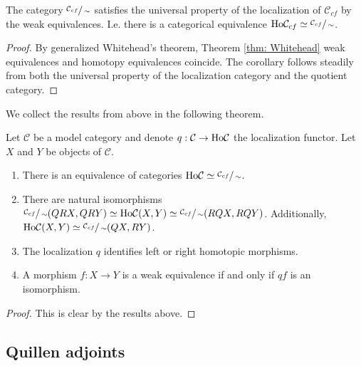 \documentclass[../thesis.tex]{subfiles}
\begin{document}
            \begin{corollary}
                The category $\sfrac{\mathcal{C}_{cf}}{\sim}$ satisfies the universal property of the localization of $\mathcal{C}_{cf}$ by the weak equivalences. I.e. there is a categorical equivalence $\tt{Ho}\mathcal{C}_{cf} \simeq \sfrac{\mathcal{C}_{cf}}{\sim}$.
            \end{corollary}

            \begin{proof}
                By generalized Whitehead's theorem, Theorem \ref{thm: Whitehead} weak equivalences and homotopy equivalences coincide. The corollary follows steadily from both the universal property of the localization category and the quotient category. 
            \end{proof}

            We collect the results from above in the following theorem.

            \begin{thm}\label{thm: Fundamental-thm-model}
                Let $\mathcal{C}$ be a model category and denote $q: \mathcal{C} \rightarrow \tt{Ho}\mathcal{C}$ the localization functor. Let $X$ and $Y$ be objects of $\mathcal{C}$.
                \begin{enumerate}
                    \item There is an equivalence of categories $\tt{Ho}\mathcal{C}\simeq \sfrac{\mathcal{C}_{cf}}{\sim}$.
                    \item There are natural isomorphisms $\sfrac{\mathcal{C}_{cf}}{\sim}(QRX,QRY)\simeq \tt{Ho}\mathcal{C}(X, Y) \simeq \sfrac{\mathcal{C}_{cf}}{\sim}(RQX, RQY)$. Additionally, $\tt{Ho}\mathcal{C}(X, Y)\simeq \sfrac{\mathcal{C}_{cf}}{\sim}(QX, RY)$.
                    \item The localization $q$ identifies left or right homotopic morphisms.
                    \item A morphism $f: X \rightarrow Y$ is a weak equivalence if and only if $qf$ is an isomorphism.
                \end{enumerate}
            \end{thm}

            \begin{proof}
                This is clear by the results above.
            \end{proof}

        \subsection{Quillen adjoints}
\end{document}
